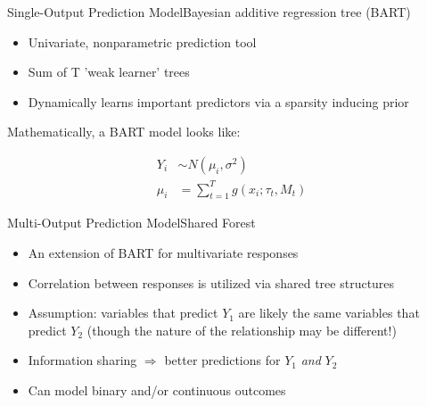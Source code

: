 \documentclass{beamer}
\begin{document}
\begin{frame}{Single-Output Prediction Model}{Bayesian additive regression tree (BART)}
\begin{itemize}
\item Univariate, nonparametric prediction tool
\item Sum of T 'weak learner' trees %
\item Dynamically learns important predictors via a sparsity inducing prior
\end{itemize}

Mathematically, a BART model looks like:

\begin{align*}
Y_i &\sim N(\mu_i, \sigma^2)\\
\mu_i &= \sum_{t=1}^T g(x_i ; \tau_t, M_t)%
\end{align*}




\end{frame}

\begin{frame}{Multi-Output Prediction Model}{Shared Forest}
\begin{itemize}
\item An extension of BART for multivariate responses
\item Correlation between responses is utilized via shared tree structures
\item Assumption: variables that predict $Y_1$ are likely the same variables that predict $Y_2$ (though the nature of the relationship may be different!)
\item Information sharing $\Rightarrow$ better predictions for $Y_1$ \textit{and} $Y_2$ 
\item Can model binary and/or continuous outcomes
\end{itemize}
\end{frame}
\end{document}
